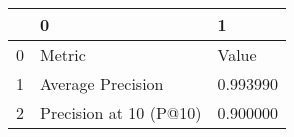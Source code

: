 \begin{tabular}{lll}
\toprule
 & 0 & 1 \\
\midrule
0 & Metric & Value \\
1 & Average Precision & 0.993990 \\
2 & Precision at 10 (P@10) & 0.900000 \\
\bottomrule
\end{tabular}
